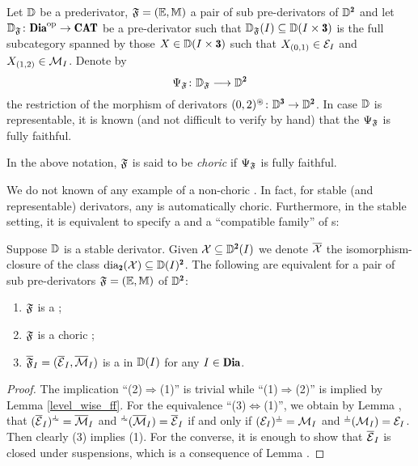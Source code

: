 \color{black}
Let $\mathbb{D}$ be a prederivator, $\mathfrak{F}=(\mathbb E,\mathbb M)$ a pair of sub pre-derivators of $\D^\due$ and let 
$\D_\F\colon \Dia^\opp\to \Cat$
be a pre-derivator such that $\D_{\F}(I)\subseteq \D(I\times \tre)$ is the full subcategory spanned by those $X\in  \D(I\times \tre)$ such that $X_{(0,1)}\in \mathcal{E}_I$ and $X_{(1,2)}\in \mathcal{M}_I$. Denote by 
\begin{equation}\label{composition_morphism}
\Psi_\F\colon \D_\F\longrightarrow \D^{\due}
\end{equation}
the restriction of the morphism of derivators $(0,2)^\circledast\colon\D^{\tre}\to \D^{\due}$. In case $\mathbb{D}$ is representable, it is known (and not difficult to verify by hand) that the $\Psi_{\mathfrak{F}}$ is fully faithful. 

\begin{definition}
In the above notation, $\mathfrak{F}$ is said to be \emph{choric} if $\Psi_{\mathfrak{F}}$ is fully faithful. 
\end{definition}

We do not known of any example of a non-choric \dpfs. In fact, for stable (and representable) derivators, any \dpfs is automatically choric. Furthermore, in the stable setting,  it is equivalent to specify a \dpfs and a ``compatible family'' of {\phfs}s: 
\color{black}
\begin{theorem}\label{stable_equv_orth_pre}
Suppose $\mathbb{D}$ is a stable derivator. Given $\class{X}\subseteq \D^\due(I)$ we denote $\overline{\mathcal{X}}$ the isomorphism\hyp{}closure of the class $\dia_\due(\class{X})\subseteq \D(I)^\due$. The following are equivalent for a pair of sub pre-derivators $\mathfrak{F}=(\mathbb E,\mathbb M)$  of $\D^{\due}$:
\begin{enumerate}%
\item $\mathfrak{F}$ is a \cpfs;
\item \color{black}$\mathfrak{F}$ is a choric \cpfs;\color{black}
\item $\overline{\mathfrak{F}}_I=(\overline{\mathcal{E}}_I,\overline{\mathcal{M}}_I)$ is a \phfs in $\mathbb{D}(I)$ for any $I\in\Dia$.
\end{enumerate}
\end{theorem}
\begin{proof}
The implication ``(2)$\Rightarrow$(1)'' is trivial while ``(1)$\Rightarrow$(2)'' is implied by Lemma \ref{level_wise_ff}. 
For the equivalence ``(3)$\Leftrightarrow$(1)'', we obtain by  Lemma , that $(\overline\E_I)^{\horth}=\overline\M_I$ and ${}^{\horth}(\overline\M_I)=\overline\E_I$ if and only if $(\E_I)^{\corth}=\M_I$ and ${}^{\corth}(\M_I)=\E_I$. Then clearly (3) implies (1). For the converse, it is enough to show that $\overline{\mathcal{E}}_I$ is closed under suspensions, which is a consequence of Lemma .
\end{proof}









